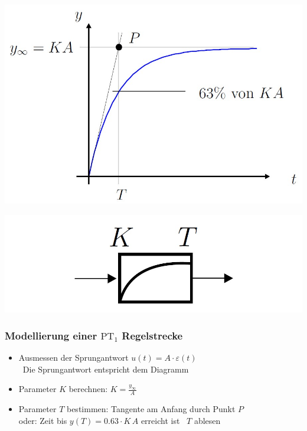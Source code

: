 \begin{minipage}{0.5\columnwidth}
    \includegraphics[width=\columnwidth]{images/pt1-glied_kennlinie}
\end{minipage}
\hfill
\begin{minipage}{0.4\columnwidth}
    \includegraphics[width=0.8\columnwidth]{images/symbol_PT1-glied}
\end{minipage}


\subsubsection{Modellierung einer $\text{PT}_1$ Regelstrecke}

\begin{itemize}
    \item Ausmessen der Sprungantwort $u(t) = A \cdot \varepsilon(t)$ \\
        \textrightarrow\ Die Sprungantwort entspricht dem Diagramm
    \item Parameter $K$ berechnen: $K = \frac{y_\infty}{A}$ 
    \item Parameter $T$ bestimmen: Tangente am Anfang durch Punkt $P$ \\
        oder: Zeit bis $y(T) = 0.63 \cdot K \, A$ erreicht ist \textrightarrow\ $T$ ablesen
\end{itemize}


